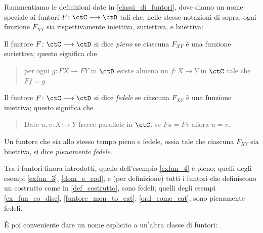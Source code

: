Rammentiamo le definizioni date in \ref{classi_di_funtori}, dove diamo un nome speciale ai funtori \(F \colon \ctC\fun\ctD\) tali che, nelle stesse notazioni di sopra, ogni funzione \(F_{XY}\) sia rispettivamente iniettiva, suriettiva, e biiettiva:
\begin{definition}\label{funtore_pieno}
 Il funtore \(F \colon \ctC\fun\ctD\) si dice \emph{pieno} se ciascuna \(F_{XY}\) è una funzione suriettiva; questo significa che
 \begin{quote}
  per ogni \(g \colon FX\to FY\) in \(\ctD\) esiste almeno un \(f \colon X\to Y\) in \(\ctC\) tale che \(Ff=g\).
 \end{quote}
\end{definition}
\begin{definition}\label{funtore_fedele}
 Il funtore \(F \colon \ctC\fun\ctD\) si dice \emph{fedele} se ciascuna \(F_{XY}\) è una funzione iniettiva; questo significa che
 \begin{quote}
  Date \(u,v \colon X\to Y\) frecce parallele in \(\ctC\), se \(Fu=Fv\) allora \(u=v\).
 \end{quote}
\end{definition}
\begin{notation}\label{fun_pienfed}
 Un funtore che sia allo stesso tempo pieno e fedele, ossia tale che ciascuna \(F_{XY}\) sia biiettiva, si dice \emph{pienamente fedele}.
\end{notation}
\begin{remark}
 Tra i funtori finora introdotti, quello dell'esempio \ref{exfun_4} è pieno; quelli degli esempi \ref{exfun_3}, \ref{dom_e_cod}, e (per definizione) tutti i funtori che definiscono un costrutto come in \ref{def_costrutto}, sono fedeli; quelli degli esempi \ref{ex_fun_co_disc}, \ref{funtore_mon_to_cat}, \ref{ord_come_cat}, sono pienamente fedeli.
\end{remark}
È poi conveniente dare un nome esplicito a un'altra classe di funtori:
